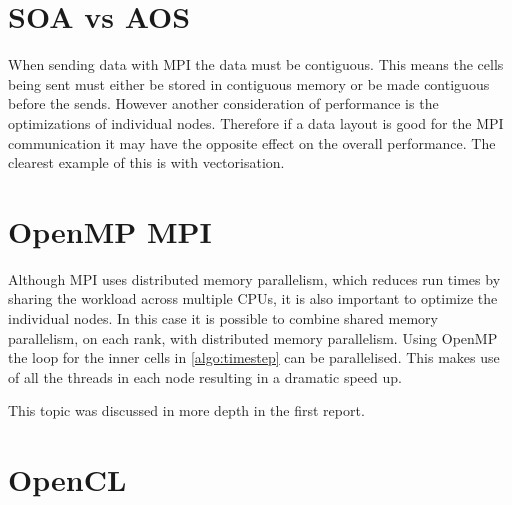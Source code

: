 \documentclass{article}
\begin{document}
\begin{multicols}{2}
\begin{center}
\begin{tikzpicture}[every node/.style={minimum size=.5cm-\pgflinewidth, outer sep=0pt}, scale=0.5]
\end{tikzpicture}
\label{fig:cells-regions-and-halos}
\end{center}


\section{SOA vs AOS}

When sending data with MPI the data must be contiguous. This means the cells
being sent must either be stored in contiguous memory or be made contiguous
before the sends. However another consideration of performance is the
optimizations of individual nodes. Therefore if a data layout is good for the
MPI communication it may have the opposite effect on the overall performance.
The clearest example of this is with vectorisation.

\section{OpenMP MPI}

Although MPI uses distributed memory parallelism, which reduces run times by
sharing the workload across multiple CPUs, it is also important to optimize the
individual nodes. In this case it is possible to combine shared memory
parallelism, on each rank, with distributed memory parallelism. Using OpenMP
the loop for the inner cells in \autoref{algo:timestep} can be parallelised. This makes use of all the threads in each node resulting in a dramatic speed up.


This topic was discussed in more depth in the first report.


\section{OpenCL}

\end{multicols}
\end{document}
